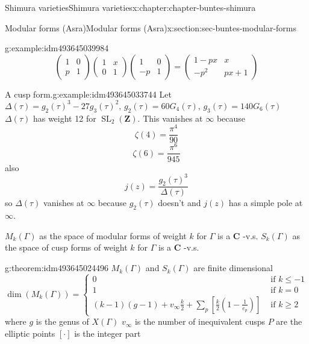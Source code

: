 \documentclass[oneside,10pt,]{book}
\numberwithin{equation}{section}
\newcommand{\lb}{[}
\newcommand{\rb}{]}
\newcommand{\ZZ}{\mathbf{Z}}
\newcommand{\CC}{\mathbf{C}}
\DeclareMathOperator{\SL}{SL}
\newcommand{\amp}{&}
\begin{document}
\begin{chapterptx}{Shimura varieties}{}{Shimura varieties}{}{}{x:chapter:chapter-buntes-shimura}
\begin{sectionptx}{Modular forms (Asra)}{}{Modular forms (Asra)}{}{}{x:section:sec-buntes-modular-forms}
\begin{example}{}{g:example:idm493645039984}
\begin{equation*}
\begin{pmatrix} 1\amp 0 \\ p \amp 1 \end{pmatrix} \begin{pmatrix} 1\amp x \\ 0 \amp 1 \end{pmatrix} \begin{pmatrix} 1\amp 0 \\ -p \amp 1 \end{pmatrix}  = \begin{pmatrix} 1 - px \amp x  \\ -p^2 \amp px+ 1 \end{pmatrix}
\end{equation*}
%
\end{example}
\begin{example}{A cusp form.}{g:example:idm493645033744}%
Let \(\Delta(\tau) = g_2(\tau)^3 - 27g_3(\tau)^2,\,g_2(\tau) = 60G_4(\tau),\,g_3(\tau) =140G_6(\tau)\) \(\Delta(\tau)\) has weight 12 for \(\SL_2(\ZZ)\). This vanishes at \(\infty\) because%
\begin{equation*}
\zeta(4) = \frac{\pi^4}{90}
\end{equation*}
%
\begin{equation*}
\zeta(6) = \frac{\pi^6}{945}
\end{equation*}
also%
\begin{equation*}
j(z) = \frac{g_2(\tau)^3}{\Delta(\tau)}
\end{equation*}
so \(\Delta(\tau)\) vanishes at \(\infty\) because \(g_2(\tau)\) doesn't  and \(j(z)\) has a  simple pole at \(\infty\).%
\end{example}
\(M_k(\Gamma)\) as the space of modular forms of weight \(k\) for \(\Gamma\) is a \(\CC\) -v.s. \(S_k(\Gamma)\) as the space of cusp forms of weight \(k\) for \(\Gamma\) is a \(\CC\) -v.s.%
\begin{theorem}{}{}{g:theorem:idm493645024496}%
\(M_k(\Gamma)\) and \(S_k(\Gamma)\) are finite dimensional%
\begin{equation*}
\dim(M_k(\Gamma)) =
\begin{cases}
0 \amp \text{ if } k \le -1\\
1 \amp \text{ if } k = 0\\
(k-1)(g-1) + v_\infty \frac k2 + \sum_p [\frac k2 (1- \frac{1}{e_p})] \amp \text{ if } k \ge 2
\end{cases}
\end{equation*}
where \(g\) is the genus of \(X(\Gamma)\) \(v_\infty\) is the number of inequivalent cusps \(P\) are the elliptic points \(\lb \cdot \rb\) is the integer part%

\end{theorem}
\end{sectionptx}
\end{chapterptx}
\end{document}
